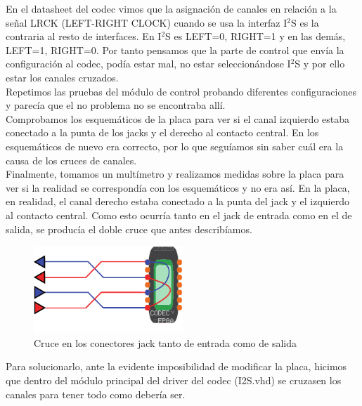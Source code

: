 En el datasheet del codec vimos que la asignación de canales en relación a la señal LRCK (LEFT-RIGHT CLOCK) cuando se usa la interfaz I$^2$S es la contraria al resto de interfaces. En I$^2$S es LEFT=0, RIGHT=1 y en las demás, LEFT=1, RIGHT=0. Por tanto pensamos que la parte de control que envía la configuración al codec, podía estar mal, no estar seleccionándose I$^2$S y por ello estar los canales cruzados.\\

Repetimos las pruebas del módulo de control probando diferentes configuraciones y parecía que el no problema no se encontraba allí.\\

Comprobamos los esquemáticos de la placa para ver si el canal izquierdo estaba conectado a la punta de los jacks y  el derecho al contacto central. En los esquemáticos de nuevo era correcto, por lo que seguíamos sin saber cuál era la causa de los cruces de canales.\\

Finalmente, tomamos un multímetro y realizamos medidas sobre la placa para ver si la realidad se correspondía con los esquemáticos y no era así. En la placa, en realidad, el canal derecho estaba conectado a la punta del jack y el izquierdo al contacto central. Como esto ocurría tanto en el jack de entrada como en el de salida, se producía el doble cruce que antes describíamos.\\

\begin{figure}[H]
\begin{center}
	\includegraphics[width=0.5\textwidth]{./swapping_channels-eps-converted-to}
\caption{Cruce en los conectores jack tanto de entrada como de salida}
\end{center}
\end{figure}

Para solucionarlo, ante la evidente imposibilidad de modificar la placa, hicimos que dentro del módulo principal del driver del codec (I2S.vhd) se cruzasen los canales para tener todo como debería ser.
		
	

	
